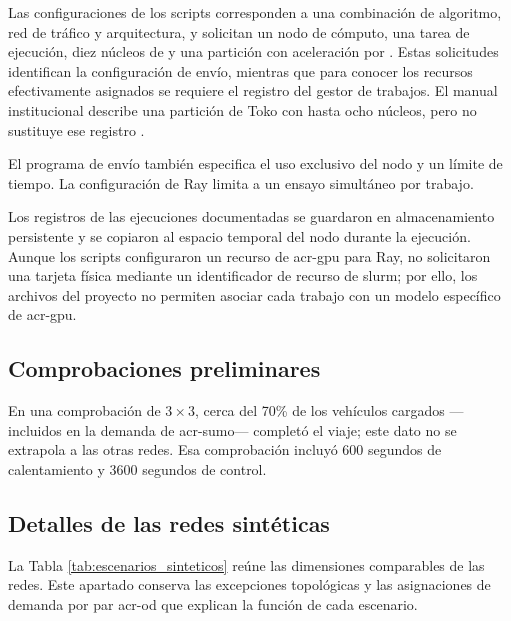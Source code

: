 Las configuraciones de los scripts corresponden a una combinación de algoritmo, red de tráfico y arquitectura, y solicitan un nodo de cómputo, una tarea de ejecución, diez núcleos de  y una partición con aceleración por . Estas solicitudes identifican la configuración de envío, mientras que para conocer los recursos efectivamente asignados se requiere el registro del gestor de trabajos. El manual institucional describe una partición de Toko con hasta ocho núcleos, pero no sustituye ese registro \cite{TokoManual2024}.

El programa de envío también especifica el uso exclusivo del nodo y un límite de tiempo. La configuración de Ray limita a un ensayo simultáneo por trabajo.

Los registros de las ejecuciones documentadas se guardaron en almacenamiento persistente y se copiaron al espacio temporal del nodo durante la ejecución. Aunque los scripts configuraron un recurso de \acrshort{acr-gpu} para Ray, no solicitaron una tarjeta física mediante un identificador de recurso de \gls{slurm}; por ello, los archivos del proyecto no permiten asociar cada trabajo con un modelo específico de \acrshort{acr-gpu}.

\subsection{Comprobaciones preliminares}
\label{subsec:comprobaciones_preliminares}

En una comprobación de $3\times3$, cerca del 70\% de los vehículos cargados —incluidos en la demanda de \acrshort{acr-sumo}— completó el viaje; este dato no se extrapola a las otras redes. Esa comprobación incluyó 600 segundos de calentamiento y 3600 segundos de control.

\subsection{Detalles de las redes sintéticas}
\label{subsec:detalles_redes_sinteticas}

La Tabla \ref{tab:escenarios_sinteticos} reúne las dimensiones comparables de las redes. Este apartado conserva las excepciones topológicas y las asignaciones de demanda por par \acrshort{acr-od} que explican la función de cada escenario.

